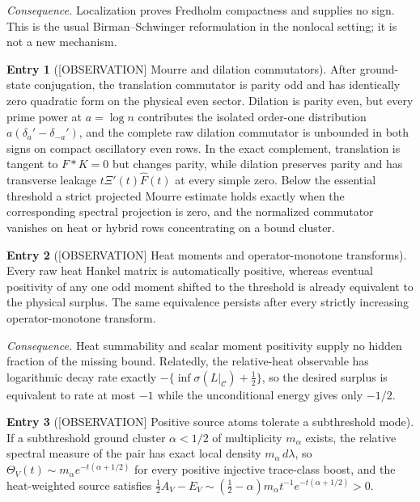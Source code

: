 \documentclass[11pt]{amsart}
\theoremstyle{definition}
\newcounter{family}
\newtheorem{entry}{Entry}[family]
\theoremstyle{remark}
\newcommand{\dd}{\,d}
\newcommand{\XiR}{\Xi}
\newcommand{\OBS}{\textup{[OBSERVATION]}}
\begin{document}
\emph{Consequence.} Localization proves Fredholm compactness and supplies
no sign.  This is the usual Birman--Schwinger reformulation in the
nonlocal setting; it is not a new mechanism.

\begin{entry}[\OBS{} Mourre and dilation commutators]
\label{ent:F2}
After ground-state conjugation, the translation commutator is parity odd
and has identically zero quadratic form on the physical even sector.
Dilation is parity even, but every prime power at \(a=\log n\) contributes
the isolated order-one distribution \(a(\delta_a'-\delta_{-a}')\), and the
complete raw dilation commutator is unbounded in both signs on compact
oscillatory even rows.  In the exact complement, translation is tangent to
\(F*K=0\) but changes parity, while dilation preserves parity and has
transverse leakage \(t\XiR'(t)\widehat F(t)\) at every simple zero.  Below
the essential threshold a strict projected Mourre estimate holds exactly
when the corresponding spectral projection is zero, and the normalized
commutator vanishes on heat or hybrid rows concentrating on a bound
cluster.
\end{entry}

\begin{entry}[\OBS{} Heat moments and operator-monotone transforms]
\label{ent:F3}
Every raw heat Hankel matrix is automatically positive, whereas eventual
positivity of any one odd moment shifted to the threshold is already
equivalent to the physical surplus.  The same equivalence persists after every
strictly increasing operator-monotone transform.
\end{entry}

\emph{Consequence.} Heat summability and scalar moment positivity supply
no hidden fraction of the missing bound.  Relatedly, the relative-heat
observable has logarithmic decay rate exactly
\(-\{\inf\sigma(L|_{\mathscr C})+\frac12\}\), so the desired surplus is
equivalent to rate at most \(-1\) while the unconditional energy gives
only \(-1/2\).

\begin{entry}[\OBS{} Positive source atoms tolerate a subthreshold mode]
\label{ent:F4}
If a subthreshold ground cluster \(\alpha<1/2\) of multiplicity
\(m_\alpha\) exists, the relative spectral measure of the pair
\cite{BirmanSolomyak} has exact local
density \(m_\alpha\dd\lambda\), so
\(\Theta_V(t)\sim m_\alpha e^{-t(\alpha+1/2)}\) for every positive
injective trace-class boost, and the heat-weighted source satisfies
\(\frac12A_V-E_V\sim(\frac12-\alpha)m_\alpha t^{-1}e^{-t(\alpha+1/2)}>0\).
\end{entry}
\end{document}
